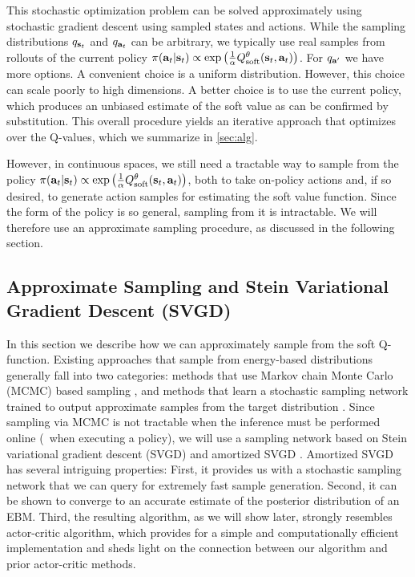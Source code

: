 \documentclass{article}
\begin{document}
This stochastic optimization problem can be solved approximately using stochastic gradient descent using sampled states and actions. While the sampling distributions $q_{\mathbf{s}_t}$ and $q_{\mathbf{a}_t}$ can be arbitrary, we typically use real samples from rollouts of the current policy $\pi({\mathbf{a}_t}|{\mathbf{s}_t}) \propto \exp\left(\frac{1}{\alpha}Q_\mathrm{soft}^{\theta}({\mathbf{s}_t}, {\mathbf{a}_t})\right)$. For $q_{\mathbf{a}'}$ we have more options. A convenient choice is a uniform distribution. However, this choice can scale poorly to high dimensions. A better choice is to use the current policy, which produces an unbiased estimate of the soft value as can be confirmed by substitution. This overall procedure yields an iterative approach that optimizes over the Q-values, which we summarize in \autoref{sec:alg}.

However, in continuous spaces, we still need a tractable way to sample from the policy $\pi({\mathbf{a}_t}|{\mathbf{s}_t}) \propto \exp\left(\frac{1}{\alpha}Q_\mathrm{soft}^{\theta}({\mathbf{s}_t}, {\mathbf{a}_t})\right)$, both to take on-policy actions and, if so desired, to generate action samples for estimating the soft value function. Since the form of the policy is so general, sampling from it is intractable. We will therefore use an approximate sampling procedure, as discussed in the following section.


\vspace{-2mm}
\subsection{Approximate Sampling and Stein Variational Gradient Descent (SVGD)}
\label{sec:inference}
\vspace{-1mm}
In this section we describe how we can approximately sample from the soft Q-function. Existing approaches that sample from energy-based distributions generally fall into two categories: methods that use Markov chain Monte Carlo (MCMC) based sampling \cite{sallans2004reinforcement}, and methods that learn a stochastic sampling network trained to output approximate samples from the target distribution \cite{zhao2016energy,kim2016deep}. Since sampling via MCMC is not tractable when the inference must be performed online (\eg~when executing a policy), we will use a sampling network based on Stein variational gradient descent (SVGD) \cite{liu2016stein} and amortized SVGD \cite{wang2016learning}. Amortized SVGD has several intriguing properties: First, it provides us with a stochastic sampling network that we can query for extremely fast sample generation. Second, it can be shown to converge to an accurate estimate of the posterior distribution of an EBM. Third, the resulting algorithm, as we will show later, strongly resembles actor-critic algorithm, which provides for a simple and computationally efficient implementation and sheds light on the connection between our algorithm and prior actor-critic methods.
\end{document}
